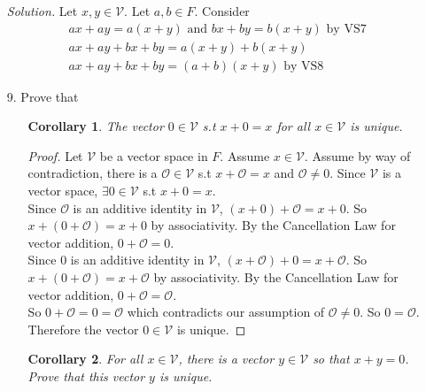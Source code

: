 \documentclass{article}
\theoremstyle{claim}
\newtheorem{corollary}{Corollary}[theorem]
\theoremstyle{definition}
\begin{document}
\begin{enumerate}
\begin{enumerate}
            \item[] \emph{Solution. } Let $x, y \in \mathcal{V}$. Let $a, b \in F$. Consider
                \begin{gather*}
                    ax + ay = a(x + y) \text{ and } bx + by = b(x + y) \text{ by VS7 }\\
                    ax + ay + bx + by = a(x + y) + b(x + y)\\
                    ax + ay + bx + by = (a + b)(x + y) \text{ by VS8 }
                \end{gather*}
            \item[9.] Prove that
                \begin{enumerate}
                    \item[]\begin{corollary}
                        The vector $0 \in \mathcal{V}$ s.t $x + 0 = x$ for all $x \in \mathcal{V}$ is unique.
                    \end{corollary}
                    \begin{proof}
                        Let $\mathcal{V}$ be a vector space in $F$. Assume $x \in \mathcal{V}$. Assume by way of contradiction, there is a $\mathcal{O} \in \mathcal{V}$ s.t $x + \mathcal{O} = x$ and $\mathcal{O} \ne 0$. Since $\mathcal{V}$ is a vector space, $\exists 0 \in \mathcal{V}$ s.t $x + 0 = x$.\\
                        Since $\mathcal{O}$ is an additive identity in $\mathcal{V}$, $(x + 0) + \mathcal{O} = x + 0$. So $x + (0 + \mathcal{O}) = x + 0$ by associativity. By the Cancellation Law for vector addition, $0 + \mathcal{O} = 0$.\\
                        Since $0$ is an additive identity in $\mathcal{V}$, $(x + \mathcal{O}) + 0 = x + \mathcal{O}$. So $x + (0 + \mathcal{O}) = x + \mathcal{O}$ by associativity. By the Cancellation Law for vector addition, $0 + \mathcal{O} = \mathcal{O}$.\\
                        So $0 + \mathcal{O} = 0 = \mathcal{O}$ which contradicts our assumption of $\mathcal{O} \ne 0$. So $0 = \mathcal{O}$. Therefore the vector $0 \in \mathcal{V}$ is unique.
                    \end{proof}
                    \item[]\begin{corollary}
                        For all $x \in \mathcal{V}$, there is a vector $y \in \mathcal{V}$ so that $x + y = 0$. Prove that this vector $y$ is unique.
                    \end{corollary}

\end{enumerate}
\end{enumerate}
\end{enumerate}
\end{document}
